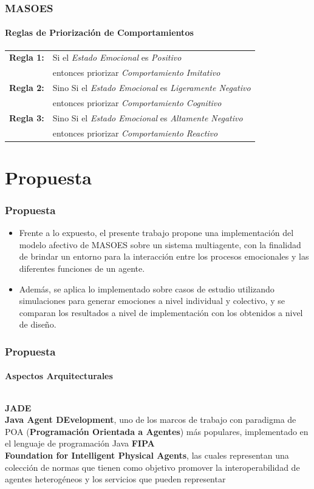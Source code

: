 \documentclass{beamer}
\begin{document}
\begin{frame}
\frametitle{MASOES}
\framesubtitle{Reglas de Priorización de Comportamientos}
\begin{table}[!ht]
\centering
\scriptsize
\begin{tabular}{ll}
\hline
\textbf{Regla 1:} & Si el \textit{Estado Emocional} es \textit{Positivo} \\
& entonces priorizar \textit{Comportamiento Imitativo} \\
\textbf{Regla 2:} & Sino Si el \textit{Estado Emocional} es \textit{Ligeramente Negativo} \\
& entonces priorizar \textit{Comportamiento Cognitivo} \\
\textbf{Regla 3:} & Sino Si el \textit{Estado Emocional} es \textit{Altamente Negativo} \\
& entonces priorizar \textit{Comportamiento Reactivo} \\
\hline
\end{tabular}
\end{table}
\end{frame}

\section{Propuesta}

\begin{frame}
\frametitle{Propuesta}
\begin{itemize}
\item Frente a lo expuesto, el presente trabajo
propone una implementación del modelo afectivo de MASOES sobre un sistema
multiagente, con la finalidad de brindar un entorno para la interacción entre los
procesos emocionales y las diferentes funciones de un agente.
\item Además, se aplica lo implementado sobre casos de estudio utilizando simulaciones para
generar emociones a nivel individual y colectivo, y se comparan los resultados a
nivel de implementación con los obtenidos a nivel de diseño.
\end{itemize}
\end{frame}

\begin{frame}
\frametitle{Propuesta}
\framesubtitle{Aspectos Arquitecturales}
\begin{columns}
\textbf{JADE}\\
\textbf{Java Agent
DEvelopment}, uno de los marcos de trabajo con paradigma de POA (\textbf{Programación Orientada a Agentes})
más populares, implementado en el lenguaje de programación Java
\textbf{FIPA}\\
\textbf{Foundation for Intelligent Physical Agents},
las cuales representan una colección de normas que tienen como objetivo promover la interoperabilidad
de agentes heterogéneos y los servicios que pueden representar
\end{columns}
\end{frame}
\end{document}
